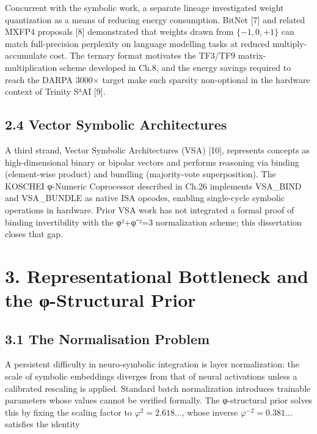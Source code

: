 Concurrent with the symbolic work, a separate
lineage investigated weight quantization as a
means of reducing energy consumption. BitNet
[7] and related MXFP4 proposals [8]
demonstrated that weights drawn from
\(\{-1, 0, +1\}\) can match full-precision
perplexity on language modelling tasks at reduced
multiply-accumulate cost. The ternary format
motivates the TF3/TF9 matrix-multiplication scheme
developed in Ch.8, and the energy savings required
to reach the DARPA 3000$\times$ target make such sparsity
non-optional in the hardware context of Trinity
S³AI [9].

\subsection{2.4 Vector Symbolic
Architectures}\label{fa_02:vector-symbolic-architectures}

A third strand, Vector Symbolic Architectures
(VSA) [10], represents concepts as
high-dimensional binary or bipolar vectors and
performs reasoning via binding (element-wise
product) and bundling (majority-vote
superposition). The KOSCHEI φ-Numeric Coprocessor
described in Ch.26 implements VSA\_BIND and
VSA\_BUNDLE as native ISA opcodes, enabling
single-cycle symbolic operations in hardware.
Prior VSA work has not integrated a formal proof
of binding invertibility with the φ²+φ⁻²=3
normalization scheme; this dissertation closes
that gap.

\section{3. Representational Bottleneck and the
φ-Structural
Prior}\label{fa_02:representational-bottleneck-and-the-ux3c6-structural-prior}

\subsection{3.1 The Normalisation
Problem}\label{fa_02:the-normalisation-problem}

A persistent difficulty in neuro-symbolic
integration is layer normalization: the scale of
symbolic embeddings diverges from that of neural
activations unless a calibrated rescaling is
applied. Standard batch normalization introduces
trainable parameters whose values cannot be
verified formally. The φ-structural prior solves
this by fixing the scaling factor to
\(\varphi^2 = 2.618\ldots\), whose inverse
\(\varphi^{-2} = 0.381\ldots\) satisfies the
identity

